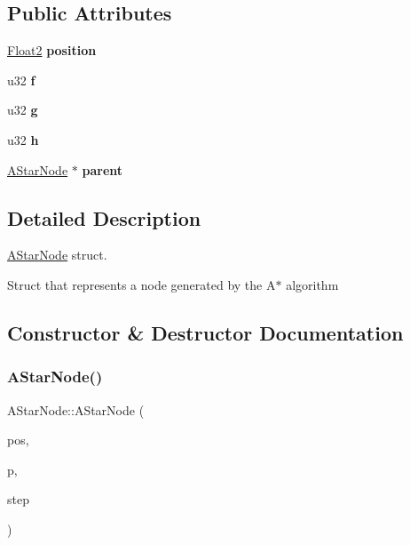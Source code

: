 \subsection*{Public Attributes}
\begin{DoxyCompactItemize}
\item 
\mbox{\label{struct_a_star_node_a5f869bfffbdca644b3b127a1f9e10f82}} 
\mbox{\hyperlink{class_float2}{Float2}} {\bfseries position}
\item 
\mbox{\label{struct_a_star_node_a84ef66a6e0f5f18a7474d4e48ea8027e}} 
u32 {\bfseries f}
\item 
\mbox{\label{struct_a_star_node_a88053a1a282d687b8ba907b40c09b192}} 
u32 {\bfseries g}
\item 
\mbox{\label{struct_a_star_node_ab48f98cada415758ef14628815a8130c}} 
u32 {\bfseries h}
\item 
\mbox{\label{struct_a_star_node_a959ff338be1bfe8327ea3bfab1535de9}} 
\mbox{\hyperlink{struct_a_star_node}{A\+Star\+Node}} $\ast$ {\bfseries parent}
\end{DoxyCompactItemize}


\subsection{Detailed Description}
\mbox{\hyperlink{struct_a_star_node}{A\+Star\+Node}} struct. 

Struct that represents a node generated by the A$\ast$ algorithm 

\subsection{Constructor \& Destructor Documentation}
\mbox{\label{struct_a_star_node_a83855bd19999236fe103de45eed4fe35}} 
\subsubsection{\texorpdfstring{A\+Star\+Node()}{AStarNode()}}
{\footnotesize\ttfamily A\+Star\+Node\+::\+A\+Star\+Node (\begin{DoxyParamCaption}\item[{\mbox{\hyperlink{class_float2}{Float2}}}]{pos,  }\item[{\mbox{\hyperlink{struct_a_star_node}{A\+Star\+Node}} $\ast$}]{p,  }\item[{s32}]{step }\end{DoxyParamCaption})}



